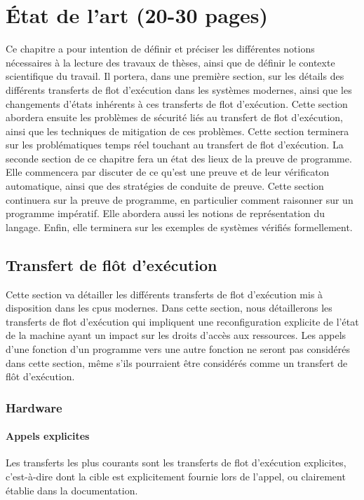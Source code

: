 \chapter{État de l'art (20-30 pages)}

	Ce chapitre a pour intention de définir et préciser les différentes notions nécessaires à la lecture des travaux de thèses, ainsi que de définir le contexte scientifique du travail. Il portera, dans une première section, sur les détails des différents transferts de flot d'exécution dans les systèmes modernes, ainsi que les changements d'états inhérents à ces transferts de flot d'exécution. Cette section abordera ensuite les problèmes de sécurité liés au transfert de flot d'exécution, ainsi que les techniques de mitigation de ces problèmes. Cette section terminera sur les problématiques temps réel touchant au transfert de flot d'exécution.
	La seconde section de ce chapitre fera un état des lieux de la preuve de programme. Elle commencera par discuter de ce qu'est une preuve et de leur vérificaton automatique, ainsi que des stratégies de conduite de preuve. Cette section continuera sur la preuve de programme, en particulier comment raisonner sur un programme impératif. Elle abordera aussi les notions de représentation du langage. Enfin, elle terminera sur les exemples de systèmes vérifiés formellement.

	\section{Transfert de flôt d'exécution}

		Cette section va détailler les différents transferts de flot d'exécution mis à disposition dans les cpus modernes.
		Dans cette section, nous détaillerons les transferts de flot d'exécution qui impliquent une reconfiguration explicite de l'état de la machine ayant un impact sur les droits d'accès aux ressources. Les appels d'une fonction d'un programme vers une autre fonction ne seront pas considérés dans cette section, même s'ils pourraient être considérés comme un transfert de flôt d'exécution.


		\subsection{Hardware}

			\subsubsection{Appels explicites}
			Les transferts les plus courants sont les transferts de flot d'exécution explicites, c'est-à-dire dont la cible est explicitement fournie lors de l’appel, ou clairement établie dans la documentation.

